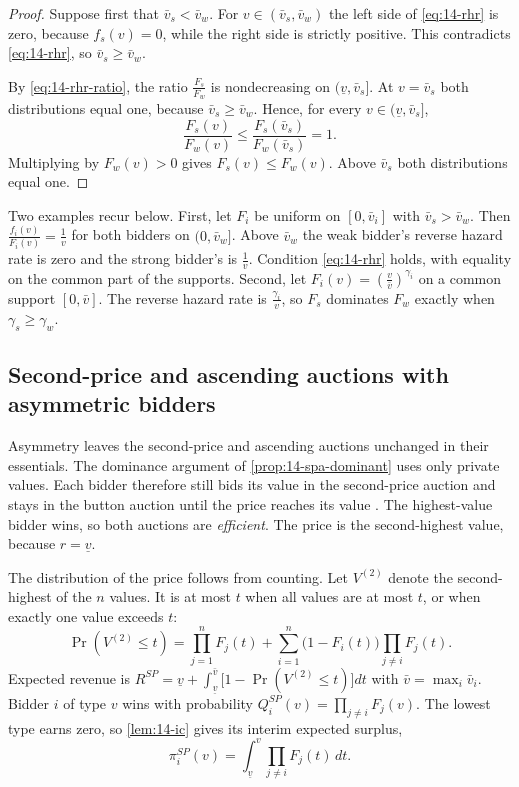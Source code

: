 \begin{proof}
Suppose first that $\bar v_s<\bar v_w$. For $v\in(\bar v_s,\bar v_w)$ the left side of
\eqref{eq:14-rhr} is zero, because $f_s(v)=0$, while the right side is strictly positive. This
contradicts \eqref{eq:14-rhr}, so $\bar v_s\ge\bar v_w$.

By \eqref{eq:14-rhr-ratio}, the ratio $\frac{F_s}{F_w}$ is nondecreasing on $(\underline v,\bar v_s]$.
At $v=\bar v_s$ both distributions equal one, because $\bar v_s\ge\bar v_w$. Hence, for every
$v\in(\underline v,\bar v_s]$,
\[
\frac{F_s(v)}{F_w(v)}\le\frac{F_s(\bar v_s)}{F_w(\bar v_s)}=1 .
\]
Multiplying by $F_w(v)>0$ gives $F_s(v)\le F_w(v)$. Above $\bar v_s$ both distributions equal one.
\end{proof}

Two examples recur below. First, let $F_i$ be uniform on $[0,\bar v_i]$ with $\bar v_s>\bar v_w$.
Then $\frac{f_i(v)}{F_i(v)}=\frac{1}{v}$ for both bidders on $(0,\bar v_w]$. Above $\bar v_w$ the weak
bidder's reverse hazard rate is zero and the strong bidder's is $\frac{1}{v}$. Condition
\eqref{eq:14-rhr} holds, with equality on the common part of the supports. Second, let
$F_i(v)=\left(\frac{v}{\bar v}\right)^{\gamma_i}$ on a common support $[0,\bar v]$. The reverse hazard
rate is $\frac{\gamma_i}{v}$, so $F_s$ dominates $F_w$ exactly when $\gamma_s\ge\gamma_w$.

\subsection{Second-price and ascending auctions with asymmetric bidders}\label{sec:14-asym-spa}

Asymmetry leaves the second-price and ascending auctions unchanged in their essentials. The dominance
argument of \cref{prop:14-spa-dominant} uses only private values. Each bidder therefore still bids its
value in the second-price auction and stays in the button auction until the price reaches its value
\citep[Section II.B]{AtheyLevinSeira2011}. The highest-value bidder wins, so both auctions are
\emph{efficient}. The price is the second-highest value, because $r=\underline v$.

The distribution of the price follows from counting. Let $V^{(2)}$ denote the second-highest of the $n$
values. It is at most $t$ when
all values are at most $t$, or when exactly one value exceeds $t$:
\begin{equation}\label{eq:14-asym-second}
\Pr\left(V^{(2)}\le t\right)=\prod_{j=1}^{n}F_j(t)+\sum_{i=1}^{n}\bigl(1-F_i(t)\bigr)\prod_{j\neq i}F_j(t).
\end{equation}
Expected revenue is $R^{SP}=\underline v+\int_{\underline v}^{\bar v}\bigl[1-\Pr(V^{(2)}\le
t)\bigr]dt$ with $\bar v=\max_i\bar v_i$. Bidder $i$ of type $v$ wins with probability
$Q_i^{SP}(v)=\prod_{j\neq i}F_j(v)$. The lowest type earns zero, so \cref{lem:14-ic} gives its
interim expected surplus,
\begin{equation}\label{eq:14-asym-spa-payoff}
\pi_i^{SP}(v)=\int_{\underline v}^{v}\prod_{j\neq i}F_j(t)\,dt .
\end{equation}


